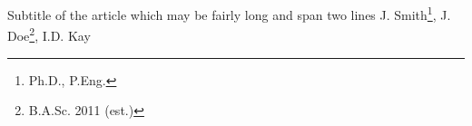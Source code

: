 %
  {Subtitle of the article which may be fairly long and span two lines}%
  {J. Smith\footnote{Ph.D., P.Eng.}, J. Doe\footnote{B.A.Sc. 2011 (est.)}, I.D. Kay}




\elrend
